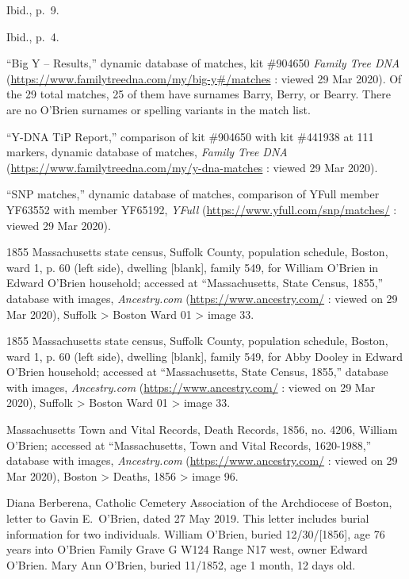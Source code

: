 \begin{thebibliography}{99}
	Ibid., p.\ 9.
	
	Ibid., p.\ 4.
	
	``Big Y -- Results,'' dynamic database of matches, kit \#904650 \textit{Family Tree DNA} (\url{https://www.familytreedna.com/my/big-y#/matches} : viewed 29 Mar 2020). Of the 29 total matches, 25 of them have surnames Barry, Berry, or Bearry. There are no O'Brien surnames or spelling variants in the match list.
	
	``Y-DNA TiP Report,'' comparison of kit \#904650 with kit \#441938 at 111 markers, dynamic database of matches, \textit{Family Tree DNA} (\url{https://www.familytreedna.com/my/y-dna-matches} : viewed 29 Mar 2020).
	
	``SNP matches,'' dynamic database of matches, comparison of YFull member YF63552 with member YF65192, \textit{YFull} (\url{https://www.yfull.com/snp/matches/} : viewed 29 Mar 2020).
	
	1855 Massachusetts state census, Suffolk County, population schedule, Boston, ward 1, p. 60 (left side), dwelling [blank], family 549, for William O'Brien in Edward O'Brien household; accessed at ``Massachusetts, State Census, 1855,'' database with images, \textit{Ancestry.com} (\url{https://www.ancestry.com/} : viewed on 29 Mar 2020), Suffolk > Boston Ward 01 > image 33.
	
	1855 Massachusetts state census, Suffolk County, population schedule, Boston, ward 1, p. 60 (left side), dwelling [blank], family 549, for Abby Dooley in Edward O'Brien household; accessed at ``Massachusetts, State Census, 1855,'' database with images, \textit{Ancestry.com} (\url{https://www.ancestry.com/} : viewed on 29 Mar 2020), Suffolk > Boston Ward 01 > image 33.
		
	Massachusetts Town and Vital Records, Death Records, 1856, no. 4206, William O'Brien; accessed at ``Massachusetts, Town and Vital Records, 1620-1988,'' database with images, \textit{Ancestry.com} (\url{https://www.ancestry.com/} : viewed on 29 Mar 2020), Boston > Deaths, 1856 > image 96.
		
	Diana Berberena, Catholic Cemetery Association of the Archdiocese of Boston, letter to Gavin E.\ O'Brien, dated 27 May 2019. This letter includes burial information for two individuals. William O'Brien, buried 12/30/[1856], age 76 years into O'Brien Family Grave G W124 Range N17 west, owner Edward O'Brien. Mary Ann O'Brien, buried 11/1852, age 1 month, 12 days old.
	

\end{thebibliography}
